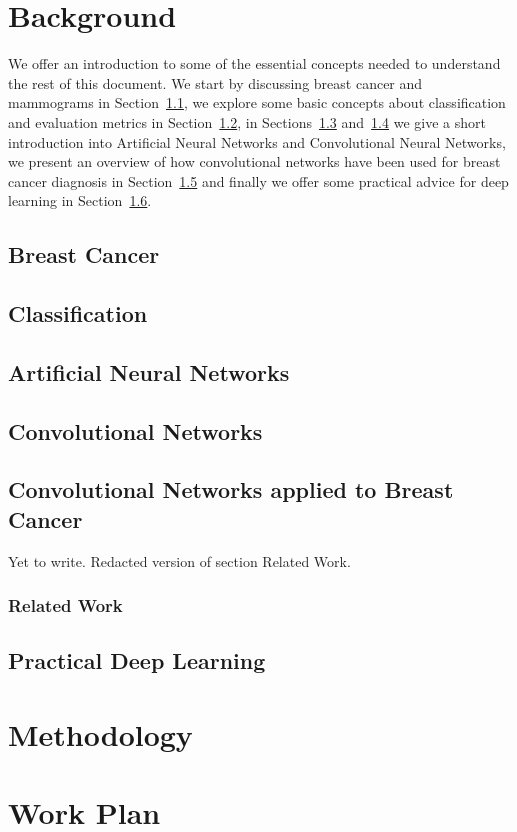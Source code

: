 \documentclass[11pt]{article}
\begin{document}
\section{Background}
\label{sec:Background}
We offer an introduction to some of the essential concepts needed to understand the rest of this document. We start by discussing breast cancer and mammograms in Section~\ref{subsec:BreastCancer}, we explore some basic concepts about classification and evaluation metrics in Section~\ref{subsec:Classification}, in Sections~\ref{subsec:ANNs} and~\ref{subsec:ConvNets} we give a short introduction into Artificial Neural Networks and Convolutional Neural Networks, we present an overview of how convolutional networks have been used for breast cancer diagnosis in Section~\ref{subsec:BreastCancerConvNets} and finally we offer some practical advice for deep learning in Section~\ref{subsec:PracticalDL}.

	\subsection{Breast Cancer}
	\label{subsec:BreastCancer}
	

	\subsection{Classification}
	\label{subsec:Classification}
	

	\subsection{Artificial Neural Networks}
	\label{subsec:ANNs}
	

	\subsection{Convolutional Networks}
	\label{subsec:ConvNets}
	

	\subsection{Convolutional Networks applied to Breast Cancer}
	\label{subsec:BreastCancerConvNets}
	Yet to write. Redacted version of section Related Work.

	\subsubsection{Related Work}
	

	\subsection{Practical Deep Learning}
	\label{subsec:PracticalDL}
	

\section{Methodology}
\label{sec:Methodology}


\section{Work Plan}
\label{sec:WorkPlan}




\end{document}
